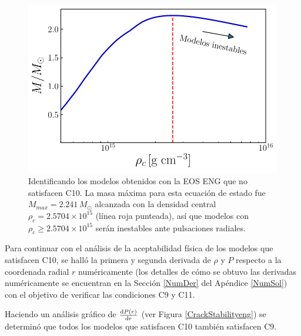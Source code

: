 \begin{figure}[H]
    \centering
    \includegraphics[width=0.7\linewidth]{figures/Mrhorel_eng.pdf}
    \caption[Identificando los modelos obtenidos con la EOS ENG que no satisfacen C10]{Identificando los modelos obtenidos con la EOS ENG que no satisfacen C10. La masa máxima para esta ecuación de estado fue $M_{max}=2.241\,M_{\odot}$ alcanzada con la densidad central $\rho_c=2.5704 \times 10^{15}$ (línea roja punteada), así que modelos con $\rho_c \geq 2.5704 \times 10^{15}$ serán inestables ante pulsaciones radiales. }
    \label{mrhoeng}
\end{figure}
Para continuar con el análisis de la aceptabilidad física de los modelos que satisfacen C10, se halló la primera y segunda derivada de $\rho$ y $P$ respecto a la coordenada radial $r$ numéricamente (los detalles de cómo se obtuvo las derivadas numéricamente se encuentran en la Sección \ref{NumDer} del Apéndice \ref{NumSol}) con el objetivo de verificar las condiciones C9 y C11.  

Haciendo un análisis gráfico de $\dv{P(r)}{r} $ (ver Figura \ref{CrackStabilityeng}) se determinó que todos los modelos que satisfacen C10 también satisfacen C9. 
 


